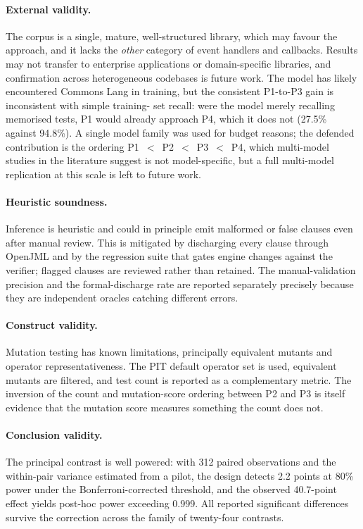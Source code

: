 \paragraph{External validity.} The corpus is a single, mature, well-structured
library, which may favour the approach, and it lacks the \emph{other} category
of event handlers and callbacks. Results may not transfer to enterprise
applications or domain-specific libraries, and confirmation across heterogeneous
codebases is future work. The model has likely encountered Commons Lang in
training, but the consistent P1-to-P3 gain is inconsistent with simple training-
set recall: were the model merely recalling memorised tests, P1 would already
approach P4, which it does not (27.5\% against 94.8\%). A single model family was
used for budget reasons; the defended contribution is the ordering
P1~$<$~P2~$<$~P3~$<$~P4, which multi-model studies in the literature suggest is
not model-specific, but a full multi-model replication at this scale is left to
future work.

\paragraph{Heuristic soundness.} Inference is heuristic and could in principle
emit malformed or false clauses even after manual review. This is mitigated by
discharging every clause through OpenJML and by the regression suite that gates
engine changes against the verifier; flagged clauses are reviewed rather than
retained. The manual-validation precision and the formal-discharge rate are
reported separately precisely because they are independent oracles catching
different errors.

\paragraph{Construct validity.} Mutation testing has known limitations,
principally equivalent mutants and operator representativeness. The PIT default
operator set is used, equivalent mutants are filtered, and test count is reported
as a complementary metric. The inversion of the count and mutation-score ordering
between P2 and P3 is itself evidence that the mutation score measures something
the count does not.

\paragraph{Conclusion validity.} The principal contrast is well powered: with
312 paired observations and the within-pair variance estimated from a pilot, the
design detects 2.2 points at 80\% power under the Bonferroni-corrected threshold,
and the observed 40.7-point effect yields post-hoc power exceeding 0.999. All
reported significant differences survive the correction across the family of
twenty-four contrasts.

